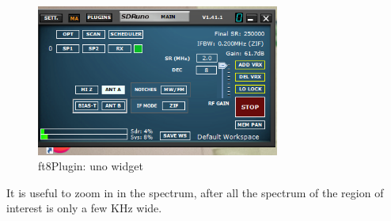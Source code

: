 \documentclass[11pt]{article}
\begin{document}
\begin{figure}[htp]
\centering
\includegraphics[width=80mm]{uno-main-widget.png}
\caption{ft8Plugin: uno widget}
\label{figure:freq_select}
\end{figure}

It is useful to zoom in in the spectrum, after all
the spectrum of the region of interest is only a few KHz wide.
\end{document}
